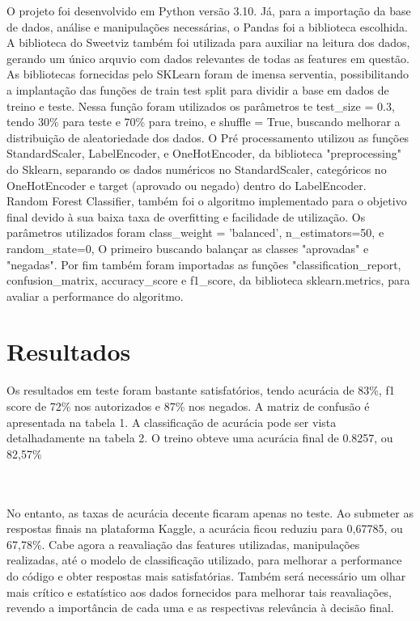 \documentclass{article}
\begin{document}
O projeto foi desenvolvido em Python versão 3.10. Já, para a importação da base de dados, análise e manipulações necessárias, o Pandas foi a biblioteca escolhida.  A biblioteca do Sweetviz também foi utilizada para auxiliar na leitura dos dados, gerando um único arquvio com dados relevantes de todas as features em questão. As bibliotecas fornecidas pelo SKLearn foram de imensa serventia, possibilitando a implantação das funções de train test split para dividir a base em dados de treino e teste. Nessa função foram utilizados os parâmetros te test\_size = 0.3, tendo 30\% para teste e 70\% para treino, e shuffle = True, buscando melhorar a distribuição de aleatoriedade dos dados. O Pré processamento utilizou as funções StandardScaler, LabelEncoder, e OneHotEncoder, da biblioteca "preprocessing" do Sklearn, separando os dados numéricos no StandardScaler, categóricos no OneHotEncoder e target (aprovado ou negado) dentro do LabelEncoder. 
\\
Random Forest Classifier, também  foi o algoritmo implementado para o objetivo final devido à sua baixa taxa de overfitting e facilidade de utilização. Os parâmetros utilizados foram class\_weight = 'balanced', n\_estimators=50, e random\_state=0, O primeiro buscando balançar as classes "aprovadas" e "negadas". Por fim também foram importadas as funções "classification\_report, confusion\_matrix, accuracy\_score e f1\_score, da biblioteca sklearn.metrics, para avaliar a performance do algoritmo.

\section{Resultados}

Os resultados em teste foram bastante satisfatórios, tendo acurácia de 83\%, f1 score de 72\% nos autorizados e 87\% nos negados. A matriz de confusão é apresentada na tabela 1. A classificação de acurácia pode ser vista detalhadamente na tabela 2. O treino obteve uma acurácia final de 0.8257, ou 82,57\%   

\\

\\
No entanto, as taxas de acurácia decente ficaram apenas no teste. Ao submeter as respostas finais na plataforma Kaggle, a acurácia ficou reduziu para 0,67785, ou 67,78\%. Cabe agora a reavaliação das features utilizadas, manipulações realizadas, até o modelo de classificação utilizado, para melhorar a performance do código e obter respostas mais satisfatórias. Também será necessário um olhar mais crítico e estatístico aos dados fornecidos para melhorar tais reavaliações, revendo a importância de cada uma e as respectivas relevância à decisão final.
\end{document}
